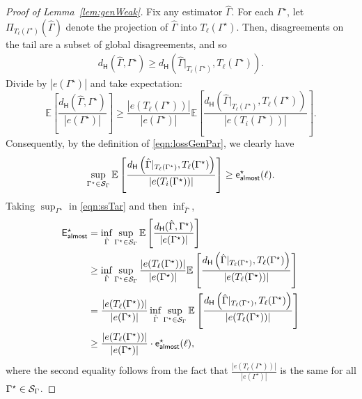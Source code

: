 \documentclass[12pt]{article}
\newcommand{\calS}{{\cal S}}
\newcommand{\p}[1]{\left(#1\right)}
\newcommand{\s}[1]{\mathsf{#1}}
\begin{document}
\begin{proof}[Proof of Lemma~\ref{lem:genWeak}]
Fix any estimator $\hat\Gamma$. For each $\Gamma^\star$, let $\Pi_{T_\ell(\Gamma^\star)}(\hat{\Gamma})$ denote the projection of $\hat{\Gamma}$ into $T_\ell(\Gamma^\star)$. Then, disagreements on the tail are a subset of global disagreements, and so
\begin{align}
d_{\s{H}}(\hat\Gamma,\Gamma^\star)\geq d_{\s{H}}\p{\hat\Gamma|_{T_\ell(\Gamma^\star)},T_\ell(\Gamma^\star)}.
\end{align}
Divide by $|e(\Gamma^\star)|$ and take expectation:
\begin{equation}
\mathbb E\left[\frac{d_{\s{H}}(\hat\Gamma,\Gamma^\star)}{|e(\Gamma^\star)|}\right]
\geq
\frac{|e(T_\ell(\Gamma^\star))|}{|e(\Gamma^\star)|}
\mathbb E\left[\frac{d_{\s{H}}\p{\hat\Gamma|_{T_\ell(\Gamma^\star)},T_\ell(\Gamma^\star)}}{|e(T_i(\Gamma^\star))|}\right].\label{eqn:ssTar}
\end{equation}
Consequently, by the definition of \eqref{eqn:lossGenPar}, we clearly have
\begin{align}
\sup_{\Gamma^\star\in\mathcal \calS_\Gamma}
\mathbb E\left[\frac{d_{\s{H}}\p{\hat\Gamma|_{T_\ell(\Gamma^\star)},T_\ell(\Gamma^\star)}}{|e(T_i(\Gamma^\star))|}\right]
\geq \s{e}_{\s{almost}}^\star(\ell).
\end{align}
Taking $\sup_{\Gamma^\star}$ in \eqref{eqn:ssTar} and then $\inf_{\hat\Gamma}$,
\begin{align}
\begin{aligned}
\s{E}^\star_{\s{almost}}
&=\inf_{\hat\Gamma}\sup_{\Gamma^\star\in\mathcal \calS_\Gamma}
\mathbb E\left[\frac{d_{\s{H}}(\hat\Gamma,\Gamma^\star)}{|e(\Gamma^\star)|}\right] \\
&\geq \inf_{\hat\Gamma}\sup_{\Gamma^\star\in\mathcal \calS_\Gamma}
\frac{|e(T_\ell(\Gamma^\star))|}{|e(\Gamma^\star)|}
\mathbb E\left[\frac{d_{\s{H}}\p{\hat\Gamma|_{T_\ell(\Gamma^\star)},T_\ell(\Gamma^\star)}}{|e(T_\ell(\Gamma^\star))|}\right] \\
& = \frac{|e(T_\ell(\Gamma^\star))|}{|e(\Gamma^\star)|} \inf_{\hat\Gamma}\sup_{\Gamma^\star\in\mathcal \calS_\Gamma}
\mathbb E\left[\frac{d_{\s{H}}\p{\hat\Gamma|_{T_\ell(\Gamma^\star)},T_\ell(\Gamma^\star)}}{|e(T_\ell(\Gamma^\star))|}\right]\\
&\ge \frac{|e(T_\ell(\Gamma^\star))|}{|e(\Gamma^\star)|}\cdot \s{e}_{\s{almost}}^\star(\ell),
\end{aligned}
\end{align}
where the second equality follows from the fact that $\frac{|e(T_\ell(\Gamma^\star))|}{|e(\Gamma^\star)|}$ is the same for all $\Gamma^\star\in\calS_\Gamma$.
\end{proof}
\end{document}
